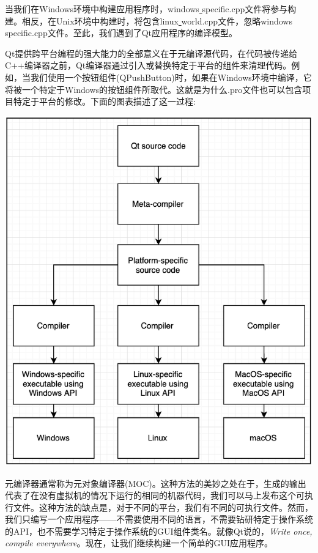 当我们在Windows环境中构建应用程序时，windows\underline{ }specific.cpp文件将参与构建。相反，在Unix环境中构建时，将包含linux\underline{ }world.cpp文件，忽略windows\underline{ }specific.cpp文件。至此，我们遇到了Qt应用程序的编译模型。 \par
Qt提供跨平台编程的强大能力的全部意义在于元编译源代码，在代码被传递给C++编译器之前，Qt编译器通过引入或替换特定于平台的组件来清理代码。例如，当我们使用一个按钮组件(QPushButton)时，如果在Windows环境中编译，它将被一个特定于Windows的按钮组件所取代。这就是为什么.pro文件也可以包含项目特定于平台的修改。下面的图表描述了这一过程: \par

\begin{center}
	\includegraphics[width=1.0\textwidth]{content/Section-2/Chapter-14/4}
\end{center}

元编译器通常称为元对象编译器(MOC)。这种方法的美妙之处在于，生成的输出代表了在没有虚拟机的情况下运行的相同的机器代码，我们可以马上发布这个可执行文件。这种方法的缺点是，对于不同的平台，我们有不同的可执行文件。然而，我们只编写一个应用程序——不需要使用不同的语言，不需要钻研特定于操作系统的API，也不需要学习特定于操作系统的GUI组件类名。就像Qt说的，\textit{Write once, compile everywhere}。现在，让我们继续构建一个简单的GUI应用程序。 \par

